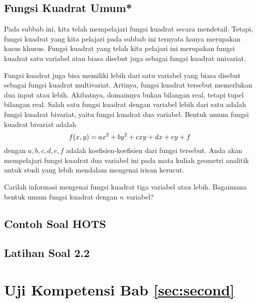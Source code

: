 \subsection{Fungsi Kuadrat Umum*}
	
	Pada subbab ini, kita telah mempelajari fungsi kuadrat secara mendetail. Tetapi, fungsi kuadrat yang kita pelajari pada subbab ini ternyata hanya merupakan kasus khusus. Fungsi kuadrat yang telah kita pelajari ini merupakan fungsi kuadrat satu variabel atau biasa disebut juga sebagai fungsi kuadrat univariat.
	
	\par Fungsi kuadrat juga bisa memiliki lebih dari satu variabel yang biasa disebut sebagai fungsi kuadrat multivariat. Artinya, fungsi kuadrat tersebut memerlukan dua input atau lebih. Akibatnya, domainnya bukan bilangan real, tetapi tupel bilangan real. Salah satu fungsi kuadrat dengan variabel lebih dari satu adalah fungsi kuadrat bivariat, yaitu fungsi kuadrat dua variabel. Bentuk umum fungsi kuadrat bivariat adalah
	\begin{equation} \label{eq:230}
		\mathop{}\!{f}{\left({x, y}\right)} = ax^{2} + by^{2} + cxy + dx + ey + f
	\end{equation}
	dengan $ a, b, c, d, e, f $ adalah koefisien-koefisien dari fungsi tersebut. Anda akan mempelajari fungsi kuadrat dua variabel ini pada mata kuliah geometri analitik untuk studi yang lebih mendalam mengenai irisan kerucut.
	
	\begin{explbox}
		Carilah informasi mengenai fungsi kuadrat tiga variabel atau lebih. Bagaimana bentuk umum fungsi kuadrat dengan $ n $ variabel?
	\end{explbox}

\subsection{Contoh Soal HOTS}
	
	\kant[10-15]
	
\newpage

\subsection{Latihan Soal 2.2}
	
	\kant[16-20]

\newpage


\section{Uji Kompetensi Bab \ref{sec:second}}

\kant[6-10]